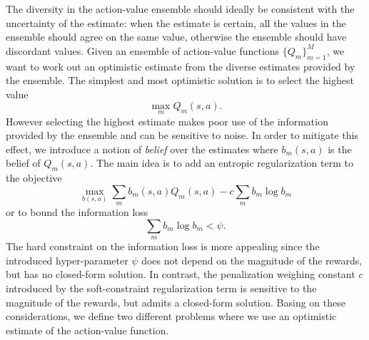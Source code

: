 The diversity in the action-value ensemble should ideally be consistent with the uncertainty of the estimate: when the estimate is certain, all the values in the ensemble should agree on the same value, otherwise the ensemble should have discordant values.
Given an ensemble of action-value functions $\{Q_m\}_{m=1}^M$, we want to work out an optimistic estimate from the diverse estimates provided by the ensemble. The simplest and most optimistic solution is to select the highest value
\begin{equation}
 \max_m Q_m(s,a).
\end{equation}
However selecting the highest estimate makes poor use of the information provided by the ensemble and can be sensitive to noise. In order to mitigate this effect, we introduce a notion of \textit{belief} over the estimates where $b_m(s,a)$ is the belief of $Q_m(s,a)$. The main idea is to add an entropic regularization term to the objective
\begin{equation}
 \max_{b(s,a)} \sum_m b_m(s,a) Q_m(s,a) - c \sum_{m} b_m \log b_m
\end{equation}
or to bound the information loss
\begin{equation}
\sum_m b_m \log b_m < \psi.
\end{equation}
The hard constraint on the information loss is more appealing since the introduced hyper-parameter $\psi$ does not depend on the magnitude of the rewards, but has no closed-form solution. In contrast, the penalization weighing constant $c$ introduced by the soft-constraint regularization term is sensitive to the magnitude of the rewards, but admits a closed-form solution.
Basing on these considerations, we define two different problems where we use an optimistic estimate of the action-value function.

